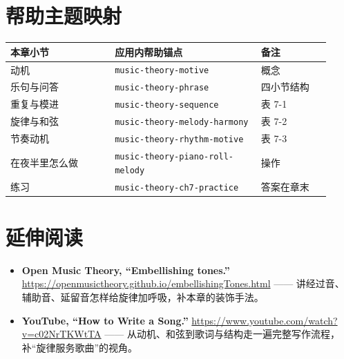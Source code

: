\section{帮助主题映射}

\begin{center}
\small
\begin{tabular}{p{0.30\linewidth}p{0.42\linewidth}p{0.20\linewidth}}
\toprule
本章小节 & 应用内帮助锚点 & 备注 \\
\midrule
动机 & \texttt{music-theory-motive} & 概念 \\
乐句与问答 & \texttt{music-theory-phrase} & 四小节结构 \\
重复与模进 & \texttt{music-theory-sequence} & 表 7-1 \\
旋律与和弦 & \texttt{music-theory-melody-harmony} & 表 7-2 \\
节奏动机 & \texttt{music-theory-rhythm-motive} & 表 7-3 \\
在夜半里怎么做 & \texttt{music-theory-piano-roll-melody} & 操作 \\
练习 & \texttt{music-theory-ch7-practice} & 答案在章末 \\
\bottomrule
\end{tabular}
\end{center}

\section*{延伸阅读}
\begin{itemize}
  \item \textbf{Open Music Theory, “Embellishing tones.”} \url{https://openmusictheory.github.io/embellishingTones.html} —— 讲经过音、辅助音、延留音怎样给旋律加呼吸，补本章的装饰手法。
  \item \textbf{YouTube, “How to Write a Song.”} \url{https://www.youtube.com/watch?v=c02NrTKWtTA} —— 从动机、和弦到歌词与结构走一遍完整写作流程，补“旋律服务歌曲”的视角。
\end{itemize}

